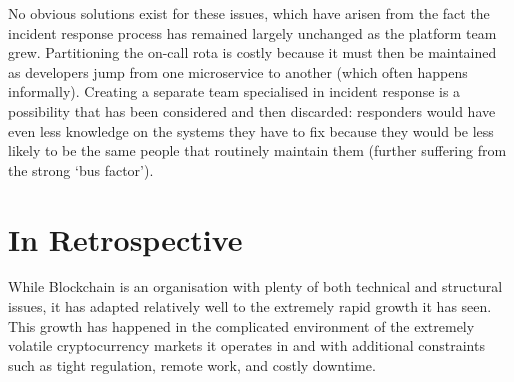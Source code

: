\documentclass[conference]{IEEEtran}
\begin{document}
    No obvious solutions exist for these issues, which have arisen from the fact the incident response process has remained largely unchanged as the platform team grew.
    Partitioning the on-call rota is costly because it must then be maintained as developers jump from one microservice to another (which often happens informally).
    Creating a separate team specialised in incident response is a possibility that has been considered and then discarded: responders would have even less knowledge on the systems they have to fix because they would be less likely to be the same people that routinely maintain them (further suffering from the strong `bus factor').


    \section{In Retrospective}\label{sec:conclusion}

    While Blockchain is an organisation with plenty of both technical and structural issues, it has adapted relatively well to the extremely rapid growth it has seen.
    This growth has happened in the complicated environment of the extremely volatile cryptocurrency markets it operates in and with additional constraints such as tight regulation, remote work, and costly downtime.

    \printbibliography
\end{document}
